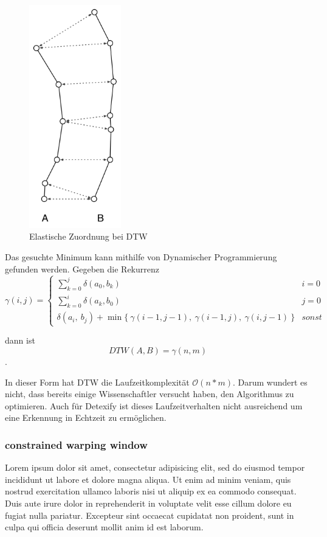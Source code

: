 \begin{figure}
  \centering \includegraphics[width=4cm]{figures/dtw.png}
  \caption{Elastische Zuordnung bei DTW}
  \label{fig:dtw}
\end{figure}

Das gesuchte Minimum kann mithilfe von Dynamischer Programmierung gefunden werden. Gegeben die Rekurrenz
\begin{equation}
  \label{eqn:dp}
  \gamma(i,j) =
  \begin{cases}
    \sum_{k=0}^j \delta(a_0, b_k) & i = 0 \\
    \sum_{k=0}^i \delta(a_k, b_0) & j = 0 \\
    \delta(a_i,~b_j) + \min\{~\gamma(i-1,j-1),~\gamma(i-1,j),~\gamma(i,j-1)~\} & sonst
  \end{cases}  
\end{equation}

dann ist
\begin{equation}
  \label{eqn:dpdtw}
  DTW(A,B) = \gamma(n,m)
\end{equation}.

In dieser Form hat DTW die Laufzeitkomplexität \(\mathcal{O}(n*m)\). Darum wundert es nicht, dass bereits einige Wissenschaftler versucht haben, den Algorithmus zu optimieren. Auch für Detexify ist dieses Laufzeitverhalten nicht ausreichend um eine Erkennung in Echtzeit zu ermöglichen.


\subsubsection{constrained warping window} %
\label{ssub:constrained_warping_window}
Lorem ipsum dolor sit amet, consectetur adipisicing elit, sed do eiusmod tempor incididunt ut labore et dolore magna aliqua. Ut enim ad minim veniam, quis nostrud exercitation ullamco laboris nisi ut aliquip ex ea commodo consequat. Duis aute irure dolor in reprehenderit in voluptate velit esse cillum dolore eu fugiat nulla pariatur. Excepteur sint occaecat cupidatat non proident, sunt in culpa qui officia deserunt mollit anim id est laborum.

